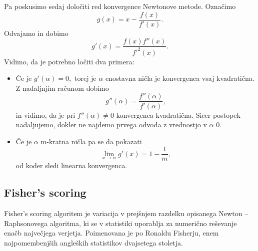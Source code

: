 \documentclass[12pt,a4paper]{amsart}
\theoremstyle{definition} %
\theoremstyle{plain} %
\begin{document}
Pa poskusimo sedaj določiti red konvergence Newtonove metode. Označimo
\[
    g(x) = x - \frac{f(x)}{f'(x)}.
\]
Odvajamo in dobimo
\[
    g'(x) = \frac{f(x)f''(x)}{f'^{2}(x)}.
\]
Vidimo, da je potrebno ločiti dva primera:
\begin{itemize}
    \item Če je $g'(\alpha) = 0,$ torej je $\alpha$ enostavna ničla je konvergenca vsaj kvadratična. Z nadaljnjim računom dobimo
    \[
        g''(\alpha) = \frac{f''(\alpha)}{f'(\alpha)},
    \]
    in vidimo, da je pri $f''(\alpha) \neq 0$ konvergenca kvadratična. Sicer postopek nadaljujemo, dokler ne najdemo prvega odvoda z vrednostjo v $\alpha$ 0.
    \item Če je $\alpha$ m-kratna ničla pa se da pokazati
    \[
        \lim_{x\to\alpha} g'(x) = 1 - \frac{1}{m},
    \]
    od koder sledi linearna konvergenca.
\end{itemize}

\subsection{Fisher's scoring}
Fisher's scoring algoritem je variacija v prejšnjem razdelku opisanega Newton -- Raphsonovega algoritma, ki se v statistiki uporablja za numerično reševanje enačb največjega 
verjetja. Poimenovana je po Ronaldu Fisherju, enem najpomembenjših angleških statistikov dvajsetega stoletja.
\end{document}
